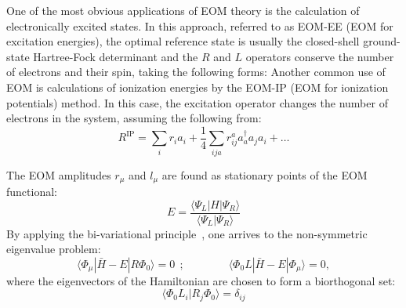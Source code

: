 \documentclass[journal=jctcce,manuscript=article]{achemso}
\begin{document}
One of the most obvious applications of EOM theory is the calculation of electronically excited states\cite{sekino1984linear,Stanton:93:EOMCC}. In this approach, referred to as EOM-EE (EOM for excitation energies), the optimal reference state is usually the closed-shell ground-state Hartree-Fock determinant and the $R$ and $L$ operators conserve the number of electrons and their spin, taking the following forms:
{}
Another common use of EOM is calculations of ionization energies by the EOM-IP (EOM for ionization potentials)
method\cite{Stanton:94:AnlDer,Stanton:EOMRev:03,PAP:EOMIP}. In this case, the excitation operator changes the number of electrons in the system, assuming the 
following from:
\begin{equation}
R^\text{IP}= \sum_{i} r_i a_i + \frac{1}{4} \sum_{ija} r_{ij}^{a} a_a^\dagger  a_j a_i + \dots
\end{equation}

The EOM amplitudes $r_\mu$ and $l_\mu$ are found as stationary points of the EOM functional:
\begin{equation}
E = \frac{\langle \Psi_L| H | \Psi_R \rangle}{\langle \Psi_L | \Psi_R \rangle} 
\end{equation}
By applying the bi-variational principle~\cite{Bivariational_Lowdin,levchenko2004equation}, one arrives  
to the non-symmetric eigenvalue problem:
\begin{equation}
\langle \Phi_\mu | \bar{H} - E | R \Phi_0 \rangle = 0~~; 
\qquad\qquad
\langle \Phi_0 L | \bar{H} - E | \Phi_\mu \rangle = 0, 
\end{equation}
where the eigenvectors of the Hamiltonian are chosen to form a biorthogonal set\cite{Stanton:93:EOMCC}: 
\begin{equation}
\langle \Phi_0 L_i| R_j \Phi_0 \rangle = \delta_{ij}
\end{equation}
\end{document}
